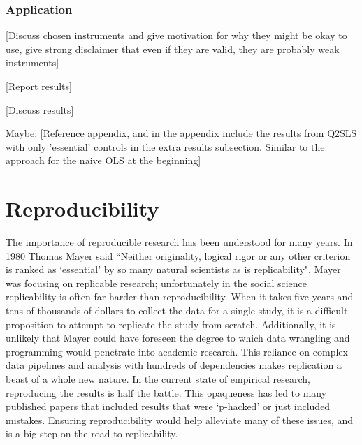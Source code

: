 \documentclass[12pt]{article}
\begin{document}
\subsubsection{Application}
\textcolor{BrickRed}{[Discuss chosen instruments and give motivation for why they might be okay to use, give strong disclaimer that even if they are valid, they are probably weak instruments]}

\textcolor{BrickRed}{[Report results]}

\textcolor{BrickRed}{[Discuss results]}

Maybe: \textcolor{BrickRed}{[Reference appendix, and in the appendix include the results from Q2SLS with only 'essential' controls in the extra results subsection. Similar to the approach for the naive OLS at the beginning]}


\newpage
\section{Reproducibility}
The importance of reproducible research has been understood for many years. In 1980 Thomas Mayer said ``Neither originality, logical rigor or any other criterion is ranked as `essential' by so many natural scientists as is replicability". Mayer was focusing on replicable research; unfortunately in the social science replicability is often far harder than reproducibility. When it takes five years and tens of thousands of dollars to collect the data for a single study, it is a difficult proposition to attempt to replicate the study from scratch. Additionally, it is unlikely that Mayer could have foreseen the degree to which data wrangling and programming would penetrate into academic research. This reliance on complex data pipelines and analysis with hundreds of dependencies makes replication a beast of a whole new nature. In the current state of empirical research, reproducing the results is half the battle. This opaqueness has led to many published papers that included results that were `p-hacked' or just included mistakes. Ensuring reproducibility would help alleviate many of these issues, and is a big step on the road to replicability.
\end{document}
